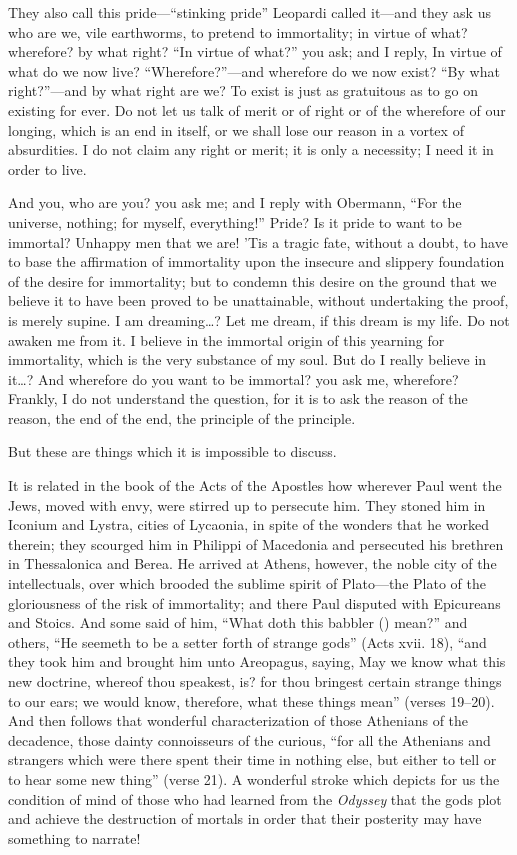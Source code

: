 They also call this pride---``stinking pride'' Leopardi called
it---and they ask us who are we, vile earthworms, to pretend to
immortality; in virtue of what? wherefore? by what right? ``In virtue
of what?'' you ask; and I reply, In virtue of what do we now live?
``Wherefore?''---and wherefore do we now exist? ``By what
right?''---and by what right are we? To exist is just as gratuitous as
to go on existing for ever. Do not let us talk of merit or of right or
of the wherefore of our longing, which is an end in itself, or we
shall lose our reason in a vortex of absurdities. I do not claim any
right or merit; it is only a necessity; I need it in order to live.

And you, who are you? you ask me; and I reply with Obermann, ``For the
universe, nothing; for myself, everything!'' Pride? Is it pride to
want to be immortal? Unhappy men that we are! 'Tis a tragic fate,
without a doubt, to have to base the affirmation of immortality upon
the insecure and slippery foundation of the desire for immortality;
but to condemn this  desire on the ground that we believe it
to have been proved to be unattainable, without undertaking the proof,
is merely supine. I am dreaming\ldots ? Let me dream, if this dream is
my life. Do not awaken me from it. I believe in the immortal origin of
this yearning for immortality, which is the very substance of my soul.
But do I really believe in it\ldots ? And wherefore do you want to be
immortal? you ask me, wherefore? Frankly, I do not understand the
question, for it is to ask the reason of the reason, the end of the
end, the principle of the principle.

But these are things which it is impossible to discuss.

It is related in the book of the Acts of the Apostles how wherever
Paul went the Jews, moved with envy, were stirred up to persecute him.
They stoned him in Iconium and Lystra, cities of Lycaonia, in spite of
the wonders that he worked therein; they scourged him in Philippi of
Macedonia and persecuted his brethren in Thessalonica and Berea. He
arrived at Athens, however, the noble city of the intellectuals, over
which brooded the sublime spirit of Pla\-to---the Plato of the
gloriousness of the risk of immortality; and there Paul disputed with
Epicureans and Stoics. And some said of him, ``What doth this babbler
() mean?'' and others, ``He seemeth to be a setter
forth of strange gods'' (Acts xvii. 18), ``and they took him and
brought him unto Areopagus, saying, May we know what this new
doctrine, whereof thou speakest, is? for thou bringest certain strange
things to our ears; we would know, therefore, what these things mean''
(verses 19--20). And then follows that wonderful characterization of
those Athenians of the decadence, those dainty connoisseurs of the
curious, ``for all the Athenians and strangers which were there spent
their time in nothing else, but either to tell or to hear some new
thing'' (verse 21). A wonderful stroke which depicts for us the
condition of mind of those who had learned from the \textit{Odyssey}
that the gods plot and  achieve the destruction of mortals in
order that their posterity may have something to narrate!

